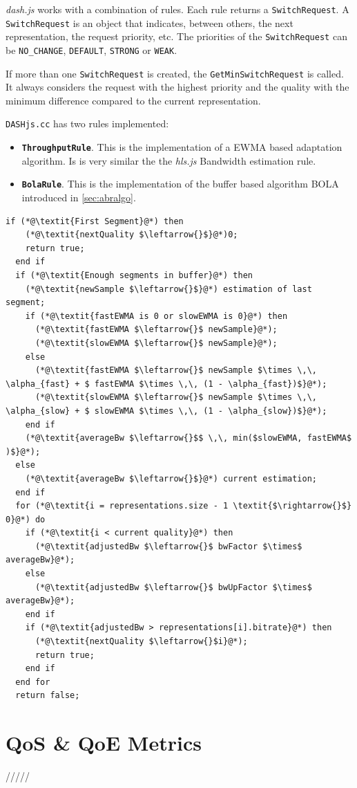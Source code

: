 \textit{dash.js} works with a combination of rules. Each rule returns a \texttt{SwitchRequest}.
A \texttt{SwitchRequest} is an object that indicates, between others, the next representation, the 
request priority, etc. The priorities of the \texttt{SwitchRequest} can be \texttt{NO\_CHANGE}, 
\texttt{DEFAULT}, \texttt{STRONG} or \texttt{WEAK}.

If more than one \texttt{SwitchRequest} is created, the \texttt{GetMinSwitchRequest} is called.
It always considers the request with the highest priority and the quality with the minimum difference compared to the
current representation.

\texttt{DASHjs.cc} has two rules implemented:

\begin{itemize}
  \item \textbf{\texttt{ThroughputRule}}. This is the implementation of a EWMA based adaptation
  algorithm. Is is very similar the the \textit{hls.js} Bandwidth estimation rule.
  \item \textbf{\texttt{BolaRule}}. This is the implementation of the buffer based algorithm
  BOLA introduced in \autoref{sec:abralgo}.

  
\end{itemize}


\begin{minipage}{\linewidth}

\begin{lstlisting}[language=myalgo, caption={HLSjs.cc Bandwidth Rule}, label={lst:hls},captionpos=b]
  if (*@\textit{First Segment}@*) then
    (*@\textit{nextQuality $\leftarrow{}$}@*)0;
    return true;
  end if
  if (*@\textit{Enough segments in buffer}@*) then
    (*@\textit{newSample $\leftarrow{}$}@*) estimation of last segment;
    if (*@\textit{fastEWMA is 0 or slowEWMA is 0}@*) then
      (*@\textit{fastEWMA $\leftarrow{}$ newSample}@*);
      (*@\textit{slowEWMA $\leftarrow{}$ newSample}@*);
    else 
      (*@\textit{fastEWMA $\leftarrow{}$ newSample $\times \,\, \alpha_{fast} + $ fastEWMA $\times \,\, (1 - \alpha_{fast})$}@*);
      (*@\textit{slowEWMA $\leftarrow{}$ newSample $\times \,\, \alpha_{slow} + $ slowEWMA $\times \,\, (1 - \alpha_{slow})$}@*);
    end if
    (*@\textit{averageBw $\leftarrow{}$$ \,\, min($slowEWMA, fastEWMA$ )$}@*);
  else
    (*@\textit{averageBw $\leftarrow{}$}@*) current estimation;
  end if
  for (*@\textit{i = representations.size - 1 \textit{$\rightarrow{}$} 0}@*) do
    if (*@\textit{i < current quality}@*) then
      (*@\textit{adjustedBw $\leftarrow{}$ bwFactor $\times$ averageBw}@*);
    else 
      (*@\textit{adjustedBw $\leftarrow{}$ bwUpFactor $\times$ averageBw}@*);
    end if
    if (*@\textit{adjustedBw > representations[i].bitrate}@*) then
      (*@\textit{nextQuality $\leftarrow{}$i}@*);
      return true;
    end if
  end for
  return false;
\end{lstlisting}
\end{minipage}

\section{QoS \& QoE Metrics}

/////


